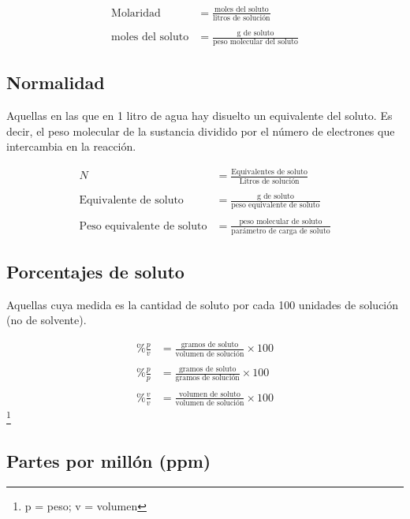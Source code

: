 \begin{align*}
\text{Molaridad} &= \frac{\text{moles del soluto}}{\text{litros de solución}}
\\
\\
\text{moles del soluto} &= \frac{\text{g de soluto}}{\text{peso molecular del soluto}}
\end{align*}

\subsection{Normalidad}

Aquellas en las que en 1 litro de agua hay disuelto un equivalente del soluto. Es decir, el peso molecular de la sustancia dividido por el número de electrones que intercambia en la reacción.

\begin{align*}
    N &= \frac{\text{Equivalentes de soluto}}{\text{Litros de solución}}
    \\
    \\
    \text{Equivalente de soluto} &= \frac{\text{g de soluto}}{\text{peso equivalente de soluto}}
    \\
    \\
    \text{Peso equivalente de soluto} &= \frac{\text{peso molecular de soluto}}{\text{parámetro de carga de soluto}}
\end{align*}

\subsection{Porcentajes de soluto}

Aquellas cuya medida es la cantidad de soluto por cada 100 unidades de solución (no de solvente).

\begin{align*}
    \%\frac{p}{v} &= \frac{\text{gramos de soluto}}{\text{volumen de solución}} \times 100
    \\
    \\
    \%\frac{p}{p} &= \frac{\text{gramos de soluto}}{\text{gramos de solución}} \times 100
    \\
    \\
    \%\frac{v}{v} &= \frac{\text{volumen de soluto}}{\text{volumen de solución}} \times 100
\end{align*}\footnote{p = peso; v = volumen}

\subsection{Partes por millón (ppm)}

